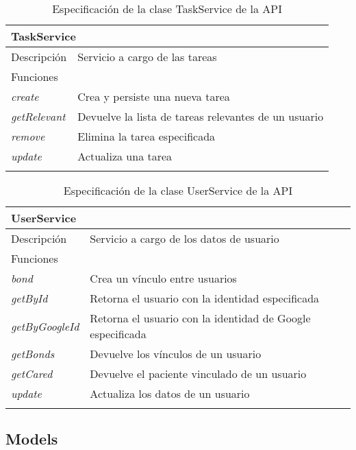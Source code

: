 \begin{longtable}{|p{} p{}|}
    \hline
    \multicolumn{2}{|l|}{TaskService} \\ \hline \hline
    Descripción      & Servicio a cargo de las tareas \\ \hline
    \multicolumn{2}{|l|}{Funciones} \\
    \emph{create}  & Crea y persiste una nueva tarea  \\
    \emph{getRelevant}  & Devuelve la lista de tareas relevantes de un usuario  \\
    \emph{remove}  & Elimina la tarea especificada  \\
    \emph{update}  & Actualiza una tarea  \\ \hline
    \caption{Especificación de la clase TaskService de la API}
    \label{class:api:task_service}
\end{longtable}

\begin{longtable}{|p{} p{}|}
    \hline
    \multicolumn{2}{|l|}{UserService} \\ \hline \hline
    Descripción      & Servicio a cargo de los datos de usuario \\ \hline
    \multicolumn{2}{|l|}{Funciones} \\
    \emph{bond}  & Crea un vínculo entre usuarios  \\
    \emph{getById}  & Retorna el usuario con la identidad especificada  \\
    \emph{getByGoogleId}  & Retorna el usuario con la identidad de Google especificada  \\
    \emph{getBonds}  & Devuelve los vínculos de un usuario  \\
    \emph{getCared}  & Devuelve el paciente vinculado de un usuario  \\
    \emph{update}  & Actualiza los datos de un usuario  \\ \hline
    \caption{Especificación de la clase UserService de la API}
    \label{class:api:user_service}
\end{longtable}

\newpage
\subsection{Models}

